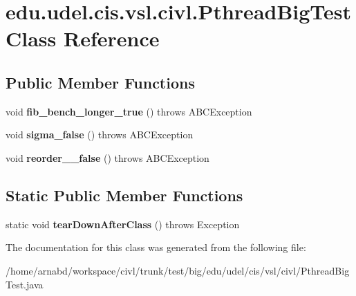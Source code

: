 \hypertarget{classedu_1_1udel_1_1cis_1_1vsl_1_1civl_1_1PthreadBigTest}{}\section{edu.\+udel.\+cis.\+vsl.\+civl.\+Pthread\+Big\+Test Class Reference}
\label{classedu_1_1udel_1_1cis_1_1vsl_1_1civl_1_1PthreadBigTest}
\subsection*{Public Member Functions}
\begin{DoxyCompactItemize}
\item 
\hypertarget{classedu_1_1udel_1_1cis_1_1vsl_1_1civl_1_1PthreadBigTest_a09eb3a230574981b14d82ebdf2f7ffd5}{}void {\bfseries fib\+\_\+bench\+\_\+longer\+\_\+true} ()  throws A\+B\+C\+Exception \label{classedu_1_1udel_1_1cis_1_1vsl_1_1civl_1_1PthreadBigTest_a09eb3a230574981b14d82ebdf2f7ffd5}

\item 
\hypertarget{classedu_1_1udel_1_1cis_1_1vsl_1_1civl_1_1PthreadBigTest_aceedfe5b25ef5281bc2fa5f867533ff8}{}void {\bfseries sigma\+\_\+false} ()  throws A\+B\+C\+Exception \label{classedu_1_1udel_1_1cis_1_1vsl_1_1civl_1_1PthreadBigTest_aceedfe5b25ef5281bc2fa5f867533ff8}

\item 
\hypertarget{classedu_1_1udel_1_1cis_1_1vsl_1_1civl_1_1PthreadBigTest_a9ce8ac1368de174eb2f3453ec1ac9c9c}{}void {\bfseries reorder\+\_\+\_\+false} ()  throws A\+B\+C\+Exception \label{classedu_1_1udel_1_1cis_1_1vsl_1_1civl_1_1PthreadBigTest_a9ce8ac1368de174eb2f3453ec1ac9c9c}

\end{DoxyCompactItemize}
\subsection*{Static Public Member Functions}
\begin{DoxyCompactItemize}
\item 
\hypertarget{classedu_1_1udel_1_1cis_1_1vsl_1_1civl_1_1PthreadBigTest_af84e74b3e978d33e07b32b151a3087a9}{}static void {\bfseries tear\+Down\+After\+Class} ()  throws Exception \label{classedu_1_1udel_1_1cis_1_1vsl_1_1civl_1_1PthreadBigTest_af84e74b3e978d33e07b32b151a3087a9}

\end{DoxyCompactItemize}


The documentation for this class was generated from the following file\+:\begin{DoxyCompactItemize}
\item 
/home/arnabd/workspace/civl/trunk/test/big/edu/udel/cis/vsl/civl/Pthread\+Big\+Test.\+java\end{DoxyCompactItemize}
